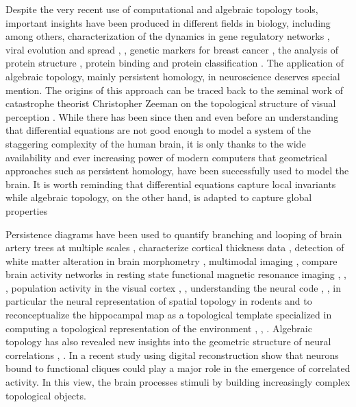 \documentclass[onecollarge,runningheads]{svjour2}
\begin{document}
Despite the very recent use of computational and algebraic topology tools, important insights have been produced in different fields in biology, including among others, characterization of the dynamics in gene regulatory networks \cite{boczko2005structure}, viral evolution and spread \cite{chan2013topology}, \cite{taylor2015topological}, genetic markers for breast cancer \cite{nicolau2011topology}, the analysis of protein structure \cite{xia2014persistent}, protein binding \cite{kovacev2016using} and protein classification \cite{cang2015topological}.
The application of algebraic topology, mainly persistent homology, in neuroscience deserves special mention. The origins of this approach can be traced back to the seminal work of catastrophe theorist Christopher Zeeman on the topological structure of visual perception \cite{zeeman:1962}. While there has been since then and even before an understanding that differential equations are not good enough to model a system of the staggering complexity of the human brain, it is only thanks to the wide availability and ever increasing power of modern computers that geometrical approaches such as persistent homology, have been successfully used to model the brain. It is worth reminding that differential equations capture local invariants while algebraic topology, on the other hand, is adapted to capture global properties \cite{hoffman1966lie} 

Persistence diagrams have been used to quantify branching and looping of brain artery trees at multiple scales \cite{bendich2016persistent},  characterize cortical thickness data \cite{chung2009persistence}, detection of white matter alteration in brain morphometry \cite{chung2015persistent}, multimodal imaging \cite{lee2017integrated}, compare brain activity networks in resting state functional magnetic resonance imaging \cite{petri2014homological}, \cite{cassidy2015brain}, \cite{lord2016insights}, population activity in the visual cortex \cite{singh2008topological}, \cite{pirino2015topological}, understanding the neural code \cite{curto2017makes}, \cite{curto2017can}, in particular  the neural representation of spatial topology in rodents \cite{chen2014neural} and to reconceptualize the hippocampal map as a topological template specialized in computing a topological representation of the environment \cite{dabaghian2012topological}, \cite{dabaghian2014reconceiving}, \cite{babichev2016topological}.
Algebraic topology has also revealed new insights into the geometric structure of neural correlations \cite{giusti2015clique}, \cite{dotko2016topological}. In a recent study \cite{reimann2017cliques} using digital reconstruction show that neurons bound to functional cliques could play a major role in the emergence of correlated activity. In this view, the brain processes stimuli by building increasingly complex topological objects.
\end{document}
